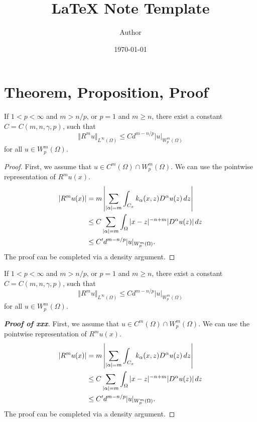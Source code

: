 \documentclass{article}
\title{\LaTeX{} Note Template}
\author{Author}
\date{\today}
\begin{document}
{}

\section{Theorem, Proposition, Proof}

\begin{theorem}
    If $1<p<\infty$ and $m > n/p$, or $p=1$ and $m \ge n$, there exist a constant $C = C(m,n,\gamma,p)$, such that
    \begin{equation*}
        \Vert R^m u \Vert_{L^\infty(\Omega)} \le C d^{m-n/p} |u|_{W^m_p(\Omega)}
    \end{equation*}
    for all $u \in W^m_p(\Omega)$.
\end{theorem}
\begin{proof}
    First, we assume that $u \in C^m(\Omega) \cap W^m_p(\Omega)$. We can use the pointwise representation of $R^mu(x)$.
    \begin{align*}
        |R^mu(x)| ={} & m \left| \sum_{|\alpha| = m} \int_{C_x} k_{\alpha}(x,z) D^\alpha u(z)\,dz \right| \notag \\
        \le{}         & C \sum_{|\alpha|=m} \int_{\Omega} |x-z|^{-n+m} |D^\alpha u(z)|\,dz \notag                \\
        \le{}         & C' d^{m-n/p} |u|_{W^m_p(\Omega)}.
    \end{align*}
    The proof can be completed via a density argument.
\end{proof}

\begin{theorem}[xxx]
    If $1<p<\infty$ and $m > n/p$, or $p=1$ and $m \ge n$, there exist a constant $C = C(m,n,\gamma,p)$, such that
    \begin{equation*}
        \Vert R^m u \Vert_{L^\infty(\Omega)} \le C d^{m-n/p} |u|_{W^m_p(\Omega)}
    \end{equation*}
    for all $u \in W^m_p(\Omega)$.
\end{theorem}
\begin{proof}[\upshape\bfseries Proof of xxx]
    First, we assume that $u \in C^m(\Omega) \cap W^m_p(\Omega)$. We can use the pointwise representation of $R^mu(x)$.
    \begin{align*}
        |R^mu(x)| ={} & m \left| \sum_{|\alpha| = m} \int_{C_x} k_{\alpha}(x,z) D^\alpha u(z)\,dz \right| \notag \\
        \le{}         & C \sum_{|\alpha|=m} \int_{\Omega} |x-z|^{-n+m} |D^\alpha u(z)|\,dz \notag                \\
        \le{}         & C' d^{m-n/p} |u|_{W^m_p(\Omega)}.
    \end{align*}
    The proof can be completed via a density argument.
\end{proof}
\end{document}
